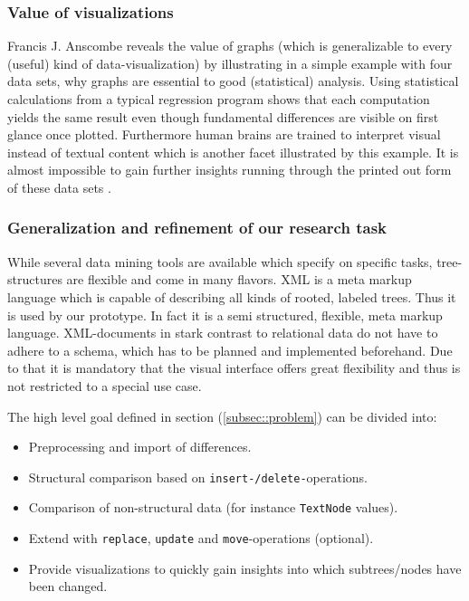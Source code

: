 \subsubsection{Value of visualizations}
Francis J. Anscombe reveals the value of graphs (which is generalizable to every (useful) kind of data-visualization) by illustrating in a simple example with four data sets, why graphs are essential to good (statistical) analysis. Using statistical calculations from a typical regression program shows that each computation yields the same result even though fundamental differences are visible on first glance once plotted. Furthermore human brains are trained to interpret visual instead of textual content which is another facet illustrated by this example. It is almost impossible to gain further insights running through the printed out form of these data sets \cite{ANSCOMBE}. 

\subsubsection{Generalization and refinement of our research task}
While several data mining tools are available which specify on specific tasks, tree-structures are flexible and come in many flavors. XML is a meta markup language which is capable of describing all kinds of rooted, labeled trees. Thus it is used by our prototype. In fact it is a semi structured, flexible, meta markup language. XML-documents in stark contrast to relational data do not have to adhere to a schema, which has to be planned and implemented beforehand. Due to that it is mandatory that the visual interface offers great flexibility and thus is not restricted to a special use case.

The high level goal defined in section (\ref{subsec::problem}) can be divided into:
\begin{itemize}
\item Preprocessing and import of differences.
\item Structural comparison based on \texttt{insert-/delete-}operations.
\item Comparison of non-structural data (for instance \texttt{TextNode} values).
\item Extend with \texttt{replace}, \texttt{update} and \texttt{move}-operations (optional).
\item Provide visualizations to quickly gain insights into which subtrees/nodes have been changed.
\end{itemize}

